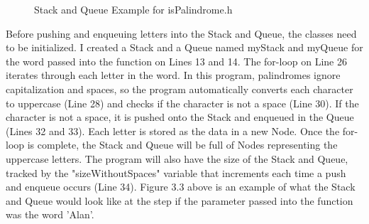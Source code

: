 \documentclass[letterpaper, 10pt]{article}
\begin{document}
\begin{figure}[H] 
    \centering 
    \caption{Stack and Queue Example for isPalindrome.h}
    \label{fig:figure3-3}
\end{figure}
\noindent
Before pushing and enqueuing letters into the Stack and Queue, the classes need to be initialized. I created a Stack and a Queue named myStack and myQueue for the word passed into the function on Lines 13 and 14. The for-loop on Line 26 iterates through each letter in the word. In this program, palindromes ignore capitalization and spaces, so the program automatically converts each character to uppercase (Line 28) and checks if the character is not a space (Line 30). If the character is not a space, it is pushed onto the Stack and enqueued in the Queue (Lines 32 and 33). Each letter is stored as the data in a new Node. Once the for-loop is complete, the Stack and Queue will be full of Nodes representing the uppercase letters. The program will also have the size of the Stack and Queue, tracked by the "sizeWithoutSpaces" variable that increments each time a push and enqueue occurs (Line 34). Figure 3.3 above is an example of what the Stack and Queue would look like at the step if the parameter passed into the function was the word 'Alan'.
\end{document}

